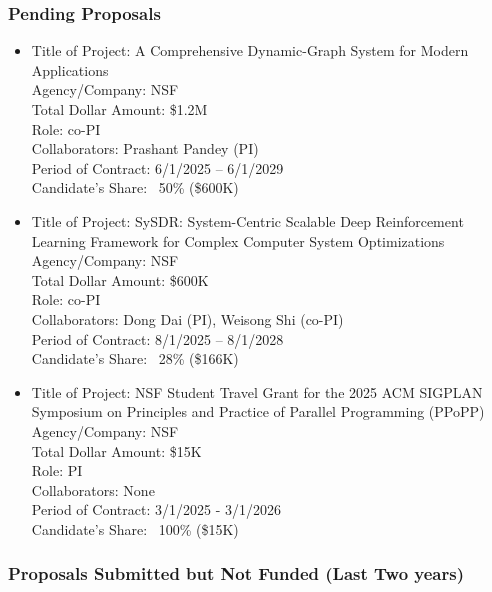 \begin{adjustwidth}{2em}{0pt}
\subsubsection{Pending Proposals}

\begin{itemize}
    \item
    Title of Project: A Comprehensive Dynamic-Graph System for Modern
    Applications \\
    Agency/Company: NSF \\
    Total Dollar Amount: \$1.2M \\
    Role: co-PI \\
    Collaborators: Prashant Pandey (PI) \\
    Period of Contract: 6/1/2025 – 6/1/2029 \\
    Candidate’s Share: ~50\% (\$600K)

    \item
    Title of Project: SySDR: System-Centric Scalable Deep Reinforcement Learning Framework for Complex Computer System Optimizations \\
    Agency/Company: NSF \\
    Total Dollar Amount: \$600K  \\
    Role: co-PI \\
    Collaborators: Dong Dai (PI), Weisong Shi (co-PI) \\
    Period of Contract: 8/1/2025 – 8/1/2028 \\
    Candidate’s Share: ~28\% (\$166K)

    \item
    Title of Project: NSF Student Travel Grant for the 2025 ACM SIGPLAN Symposium on Principles and Practice of Parallel Programming (PPoPP) \\
    Agency/Company: NSF \\
    Total Dollar Amount: \$15K \\
    Role: PI \\
    Collaborators: None \\
    Period of Contract: 3/1/2025 - 3/1/2026 \\
    Candidate’s Share: ~100\% (\$15K)
\end{itemize}

\subsubsection{Proposals Submitted but Not Funded (Last Two years)}


\end{adjustwidth}
